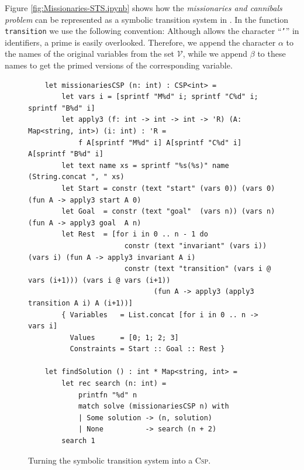Figure \ref{fig:Missionaries-STS.ipynb} shows how the \emph{missionaries and cannibals problem} can be
represented as a symbolic transition system in \Fsharp.  In the function \texttt{transition} 
we use the following convention: Although \Fsharp{} allows the character ``\texttt{'}'' in identifiers, a
prime is easily overlooked.  Therefore, we append the character $\alpha$ to the names of the original
variables from the set $\mathcal{V}$, while we append $\beta$ to these names to get the primed versions of the
corresponding variable.


\begin{figure}[!ht]
\centering
\begin{verbatim}
    let missionariesCSP (n: int) : CSP<int> =
        let vars i = [sprintf "M%d" i; sprintf "C%d" i; sprintf "B%d" i]
        let apply3 (f: int -> int -> int -> 'R) (A: Map<string, int>) (i: int) : 'R =
            f A[sprintf "M%d" i] A[sprintf "C%d" i] A[sprintf "B%d" i]
        let text name xs = sprintf "%s(%s)" name (String.concat ", " xs)
        let Start = constr (text "start" (vars 0)) (vars 0) (fun A -> apply3 start A 0)
        let Goal  = constr (text "goal"  (vars n)) (vars n) (fun A -> apply3 goal  A n)
        let Rest  = [for i in 0 .. n - 1 do
                       constr (text "invariant" (vars i)) (vars i) (fun A -> apply3 invariant A i)
                       constr (text "transition" (vars i @ vars (i+1))) (vars i @ vars (i+1))
                              (fun A -> apply3 (apply3 transition A i) A (i+1))]
        { Variables   = List.concat [for i in 0 .. n -> vars i]
          Values      = [0; 1; 2; 3]
          Constraints = Start :: Goal :: Rest }

    let findSolution () : int * Map<string, int> =
        let rec search (n: int) =
            printfn "%d" n
            match solve (missionariesCSP n) with
            | Some solution -> (n, solution)
            | None          -> search (n + 2)
        search 1
\end{verbatim}
\vspace*{-0.3cm}
\caption{Turning the symbolic transition system into a \textsc{Csp}.}
\label{fig:Missionaries-STS.ipynb-2}
\end{figure}

